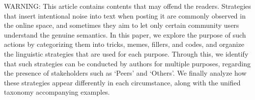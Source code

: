 WARNING: This article contains contents that may offend the readers. Strategies that insert intentional noise into text when posting it are commonly observed in the online space, and sometimes they aim to let only certain community users understand the genuine semantics. In this paper, we explore the purpose of such actions by categorizing them into tricks, memes, fillers, and codes, and organize the linguistic strategies that are used for each purpose. Through this, we identify that such strategies can be conducted by authors for multiple purposes, regarding the presence of stakeholders such as `Peers' and `Others'. We finally analyze how these strategies appear differently in each circumstance, along with the unified taxonomy accompanying examples.
